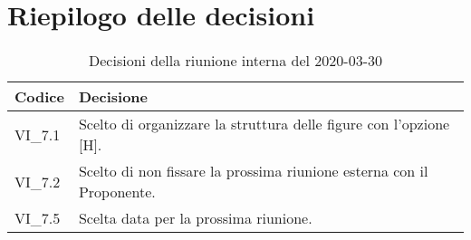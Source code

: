 \section{Riepilogo delle decisioni}
\begin{longtable}{ 
	 >{\centering}p{} >{}p{} }
	
	\caption{Decisioni della riunione interna del 2020-03-30}\\	
	
	\textbf{\color{white}Codice} & 
	\textbf{\color{white}Decisione} 
	\tabularnewline  
	\endhead
	
	VI\_7.1 & Scelto di organizzare la struttura delle figure con l'opzione [H]. \\
	VI\_7.2 & Scelto di non fissare la prossima riunione esterna con il Proponente. \\
	VI\_7.5 & Scelta data per la prossima riunione. \\
	
\end{longtable}